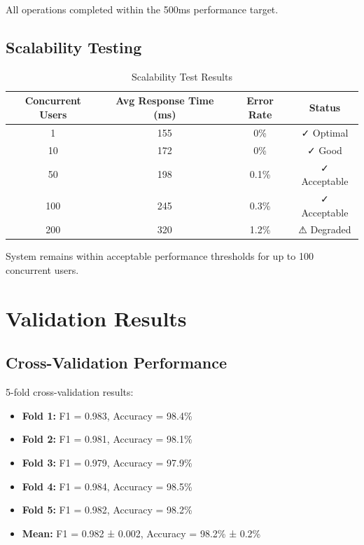 \documentclass[12pt,a4paper,twoside]{report}
\begin{document}
All operations completed within the 500ms performance target.

\subsection{Scalability Testing}

\begin{table}[H]
    \centering
    \begin{tabular}{|c|c|c|c|}
        \hline
        \textbf{Concurrent Users} & \textbf{Avg Response Time (ms)} & \textbf{Error Rate} & \textbf{Status} \\
        \hline
        1 & 155 & 0\% & ✓ Optimal \\
        \hline
        10 & 172 & 0\% & ✓ Good \\
        \hline
        50 & 198 & 0.1\% & ✓ Acceptable \\
        \hline
        100 & 245 & 0.3\% & ✓ Acceptable \\
        \hline
        200 & 320 & 1.2\% & ⚠ Degraded \\
        \hline
    \end{tabular}
    \caption{Scalability Test Results}
\end{table}

System remains within acceptable performance thresholds for up to 100 concurrent users.

\section{Validation Results}

\subsection{Cross-Validation Performance}

5-fold cross-validation results:

\begin{itemize}
    \item \textbf{Fold 1:} F1 = 0.983, Accuracy = 98.4\%
    \item \textbf{Fold 2:} F1 = 0.981, Accuracy = 98.1\%
    \item \textbf{Fold 3:} F1 = 0.979, Accuracy = 97.9\%
    \item \textbf{Fold 4:} F1 = 0.984, Accuracy = 98.5\%
    \item \textbf{Fold 5:} F1 = 0.982, Accuracy = 98.2\%
    \item \textbf{Mean:} F1 = 0.982 ± 0.002, Accuracy = 98.2\% ± 0.2\%
\end{itemize}
\end{document}
